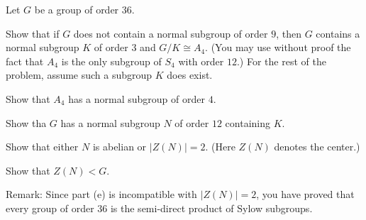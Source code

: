Let $G$ be a group of order $36$.
\begin{alist}
\item Show that if $G$ does not contain a normal subgroup of order
$9$, then $G$ contains a normal subgroup $K$ of order $3$ and
$G/K\cong A_4$. (You may use without proof the fact that $A_4$ is the
only subgroup of $S_4$ with order $12$.) For the rest of the problem,
assume such a subgroup $K$ does exist.
\item Show that $A_4$ has a normal subgroup of order $4$.
\item Show tha $G$ has a normal subgroup $N$ of order $12$ containing
$K$.
\item Show that either $N$ is abelian or $|Z(N)|=2$. (Here $Z(N)$
denotes the center.)
\item Show that $Z(N)<G$.
\end{alist}

Remark: Since part (e) is incompatible with $|Z(N)|=2$, you have
proved that every group of order $36$ is the semi-direct product of
Sylow subgroups.
